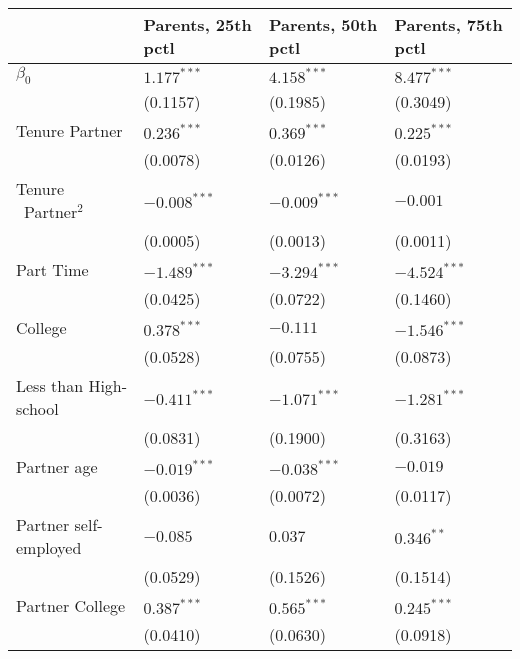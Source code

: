 \begin{tabular}{llll}
\toprule
{} & Parents, 25th pctl & Parents, 50th pctl & Parents, 75th pctl \\
\midrule
$\beta_0$                     &      $1.177^{***}$ &      $4.158^{***}$ &      $8.477^{***}$ \\
                              &           (0.1157) &           (0.1985) &           (0.3049) \\
Tenure Partner                &      $0.236^{***}$ &      $0.369^{***}$ &      $0.225^{***}$ \\
                              &           (0.0078) &           (0.0126) &           (0.0193) \\
Tenure \ Partner$^{2}$        &     $-0.008^{***}$ &     $-0.009^{***}$ &           $-0.001$ \\
                              &           (0.0005) &           (0.0013) &           (0.0011) \\
Part Time                     &     $-1.489^{***}$ &     $-3.294^{***}$ &     $-4.524^{***}$ \\
                              &           (0.0425) &           (0.0722) &           (0.1460) \\
College                       &      $0.378^{***}$ &           $-0.111$ &     $-1.546^{***}$ \\
                              &           (0.0528) &           (0.0755) &           (0.0873) \\
Less than High-school         &     $-0.411^{***}$ &     $-1.071^{***}$ &     $-1.281^{***}$ \\
                              &           (0.0831) &           (0.1900) &           (0.3163) \\
Partner age                   &     $-0.019^{***}$ &     $-0.038^{***}$ &           $-0.019$ \\
                              &           (0.0036) &           (0.0072) &           (0.0117) \\
Partner self-employed         &           $-0.085$ &            $0.037$ &       $0.346^{**}$ \\
                              &           (0.0529) &           (0.1526) &           (0.1514) \\
Partner College               &      $0.387^{***}$ &      $0.565^{***}$ &      $0.245^{***}$ \\
                              &           (0.0410) &           (0.0630) &           (0.0918) \\

\end{tabular}
